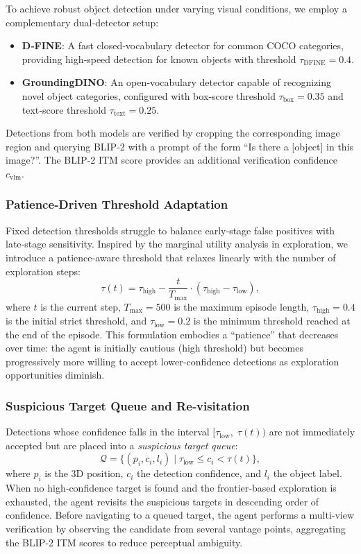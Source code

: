 \documentclass[conference]{IEEEtran}
\begin{document}
To achieve robust object detection under varying visual conditions, we employ a complementary dual‑detector setup:
\begin{itemize}
    \item \textbf{D‑FINE}: A fast closed‑vocabulary detector for common COCO categories, providing high‑speed detection for known objects with threshold $\tau_{\text{DFINE}} = 0.4$.
    \item \textbf{GroundingDINO}: An open‑vocabulary detector capable of recognizing novel object categories, configured with box‑score threshold $\tau_{\text{box}} = 0.35$ and text‑score threshold $\tau_{\text{text}} = 0.25$.
\end{itemize}
Detections from both models are verified by cropping the corresponding image region and querying BLIP‑2 with a prompt of the form “Is there a [object] in this image?”. The BLIP‑2 ITM score provides an additional verification confidence $c_{\text{vlm}}$.

\subsubsection{Patience‑Driven Threshold Adaptation}

Fixed detection thresholds struggle to balance early‑stage false positives with late‑stage sensitivity. Inspired by the marginal utility analysis in exploration, we introduce a patience‑aware threshold that relaxes linearly with the number of exploration steps:
\begin{equation}
    \tau(t) = \tau_{\text{high}} - \frac{t}{T_{\text{max}}} \cdot (\tau_{\text{high}} - \tau_{\text{low}}),
\end{equation}
where $t$ is the current step, $T_{\text{max}} = 500$ is the maximum episode length, $\tau_{\text{high}} = 0.4$ is the initial strict threshold, and $\tau_{\text{low}} = 0.2$ is the minimum threshold reached at the end of the episode. This formulation embodies a “patience” that decreases over time: the agent is initially cautious (high threshold) but becomes progressively more willing to accept lower‑confidence detections as exploration opportunities diminish.

\subsubsection{Suspicious Target Queue and Re‑visitation}

Detections whose confidence falls in the interval $[\tau_{\text{low}},\; \tau(t))$ are not immediately accepted but are placed into a \emph{suspicious target queue}:
\begin{equation}
    \mathcal{Q} = \{(p_i, c_i, l_i) \mid \tau_{\text{low}} \le c_i < \tau(t)\},
\end{equation}
where $p_i$ is the 3D position, $c_i$ the detection confidence, and $l_i$ the object label. When no high‑confidence target is found and the frontier‑based exploration is exhausted, the agent revisits the suspicious targets in descending order of confidence. Before navigating to a queued target, the agent performs a multi‑view verification by observing the candidate from several vantage points, aggregating the BLIP‑2 ITM scores to reduce perceptual ambiguity.
\end{document}
